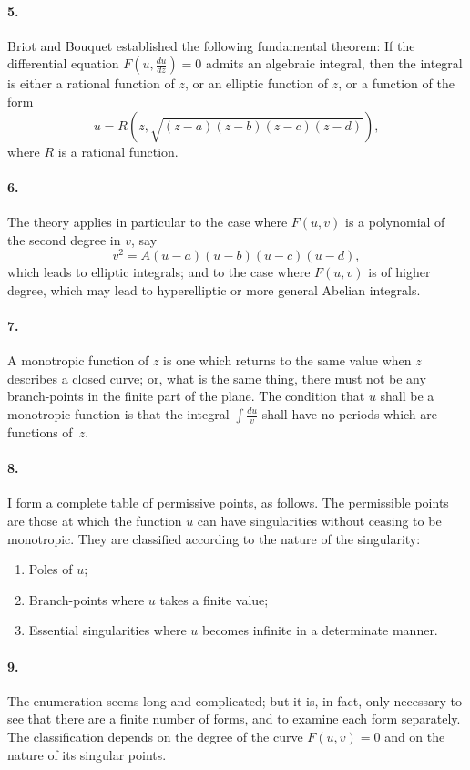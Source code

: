 \documentclass[11pt,a4paper]{book}
\begin{document}
\paragraph{5.} Briot and Bouquet established the following fundamental theorem: If the differential equation $F(u, \frac{du}{dz}) = 0$ admits an algebraic integral, then the integral is either a rational function of $z$, or an elliptic function of $z$, or a function of the form
\[
u = R(z, \sqrt{(z - a)(z - b)(z - c)(z - d)}),
\]
where $R$ is a rational function.

\paragraph{6.} The theory applies in particular to the case where $F(u, v)$ is a polynomial of the second degree in $v$, say
\[
v^{2} = A(u - a)(u - b)(u - c)(u - d),
\]
which leads to elliptic integrals; and to the case where $F(u, v)$ is of higher degree, which may lead to hyperelliptic or more general Abelian integrals.

\paragraph{7.} A monotropic function of $z$ is one which returns to the same value when $z$ describes a closed curve; or, what is the same thing, there must not be any branch-points in the finite part of the plane. The condition that $u$ shall be a monotropic function is that the integral $\int \frac{du}{v}$ shall have no periods which are functions of~$z$.

\paragraph{8.} I form a complete table of permissive points, as follows. The permissible points are those at which the function $u$ can have singularities without ceasing to be monotropic. They are classified according to the nature of the singularity:
\begin{enumerate}[label=(\alph*)]
\item Poles of $u$;
\item Branch-points where $u$ takes a finite value;
\item Essential singularities where $u$ becomes infinite in a determinate manner.
\end{enumerate}

\paragraph{9.} The enumeration seems long and complicated; but it is, in fact, only necessary to see that there are a finite number of forms, and to examine each form separately. The classification depends on the degree of the curve $F(u, v) = 0$ and on the nature of its singular points.
\end{document}
